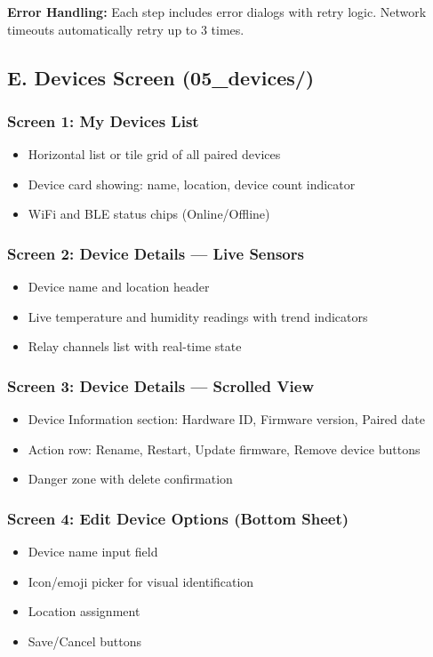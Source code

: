 \textbf{Error Handling:} Each step includes error dialogs with retry logic. Network timeouts automatically retry up to 3 times.

\subsection{E. Devices Screen (05\_devices/)}

\subsubsection{Screen 1: My Devices List}
\begin{itemize}
    \item Horizontal list or tile grid of all paired devices
    \item Device card showing: name, location, device count indicator
    \item WiFi and BLE status chips (Online/Offline)
\end{itemize}

\subsubsection{Screen 2: Device Details — Live Sensors}
\begin{itemize}
    \item Device name and location header
    \item Live temperature and humidity readings with trend indicators
    \item Relay channels list with real-time state
\end{itemize}

\subsubsection{Screen 3: Device Details — Scrolled View}
\begin{itemize}
    \item Device Information section: Hardware ID, Firmware version, Paired date
    \item Action row: Rename, Restart, Update firmware, Remove device buttons
    \item Danger zone with delete confirmation
\end{itemize}

\subsubsection{Screen 4: Edit Device Options (Bottom Sheet)}
\begin{itemize}
    \item Device name input field
    \item Icon/emoji picker for visual identification
    \item Location assignment
    \item Save/Cancel buttons
\end{itemize}

